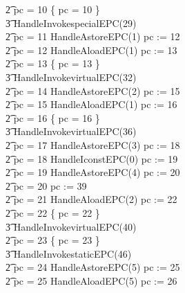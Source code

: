 \begin{figure}[tp!]
\begin{minipage}{0.5\textwidth}
{\begin{circus}
    \t2 {} \circelse pc = 10 \circthen \{ pc = 10 \} \circseq \\
    \t3 HandleInvokespecialEPC(29) \\
    \t2 {} \circelse pc = 11 \circthen HandleAstoreEPC(1) \circseq pc := 12 \\
    \t2 {} \circelse pc = 12 \circthen HandleAloadEPC(1) \circseq pc := 13 \\
    \t2 {} \circelse pc = 13 \circthen \{ pc = 13 \} \circseq \\
    \t3 HandleInvokevirtualEPC(32) \\
    \t2 {} \circelse pc = 14 \circthen HandleAstoreEPC(2) \circseq pc := 15 \\
    \t2 {} \circelse pc = 15 \circthen HandleAloadEPC(1) \circseq pc := 16 \\
    \t2 {} \circelse pc = 16 \circthen \{ pc = 16 \} \circseq \\
    \t3 HandleInvokevirtualEPC(36) \\
    \t2 {} \circelse pc = 17 \circthen HandleAstoreEPC(3) \circseq pc := 18 \\
    \t2 {} \circelse pc = 18 \circthen HandleIconstEPC(0) \circseq pc := 19 \\
    \t2 {} \circelse pc = 19 \circthen HandleAstoreEPC(4) \circseq pc := 20 \\
    \t2 {} \circelse pc = 20 \circthen pc := 39 \\
    \t2 {} \circelse pc = 21 \circthen HandleAloadEPC(2) \circseq pc := 22 \\
    \t2 {} \circelse pc = 22 \circthen \{ pc = 22 \} \circseq \\
    \t3 HandleInvokevirtualEPC(40) \\
    \t2 {} \circelse pc = 23 \circthen \{ pc = 23 \} \circseq \\
    \t3 HandleInvokestaticEPC(46) \\
    \t2 {} \circelse pc = 24 \circthen HandleAstoreEPC(5) \circseq pc := 25 \\
    \t2 {} \circelse pc = 25 \circthen HandleAloadEPC(5) \circseq pc := 26 \\
  \end{circus}
  }
  \end{minipage}
  \begin{minipage}{0.5\textwidth}
\end{minipage}
\end{figure}
